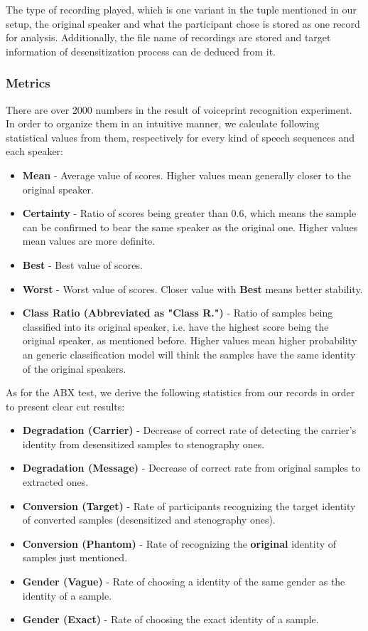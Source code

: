 \documentclass[journal]{IEEEtran} %
\begin{document}
The type of recording played, which is one variant in the tuple mentioned in our setup, the original speaker and what the participant chose is stored as one record for analysis. Additionally, the file name of recordings are stored and target information of desensitization process can de deduced from it.

\subsubsection{Metrics}

There are over 2000 numbers in the result of voiceprint recognition experiment. In order to organize them in an intuitive manner, we calculate following statistical values from them, respectively for every kind of speech sequences and each speaker:

\begin{itemize}
    \item \textbf{Mean} - Average value of scores. Higher values mean generally closer to the original speaker.
    \item \textbf{Certainty} - Ratio of scores being greater than 0.6, which means the sample can be confirmed to bear the same speaker as the original one. Higher values mean values are more definite.
    \item \textbf{Best} - Best value of scores.
    \item \textbf{Worst} - Worst value of scores. Closer value with \textbf{Best} means better stability.
    \item \textbf{Class Ratio (Abbreviated as "Class R.")} - Ratio of samples being classified into its original speaker, i.e. have the highest score being the original speaker, as mentioned before. Higher values mean higher probability an generic classification model will think the samples have the same identity of the original speakers.
\end{itemize}

As for the ABX test, we derive the following statistics from our records in order to present clear cut results:

\begin{itemize}
    \item \textbf{Degradation (Carrier)} - Decrease of correct rate of detecting the carrier's identity from desensitized samples to stenography ones.
    \item \textbf{Degradation (Message)} - Decrease of correct rate from original samples to extracted ones.
    \item \textbf{Conversion (Target)} - Rate of participants recognizing the target identity of converted samples (desensitized and stenography ones).
    \item \textbf{Conversion (Phantom)} - Rate of recognizing the \textbf{original} identity of samples just mentioned.
    \item \textbf{Gender (Vague)} - Rate of choosing a identity of the same gender as the identity of a sample.
    \item \textbf{Gender (Exact)} - Rate of choosing the exact identity of a sample.
\end{itemize}
\end{document}
